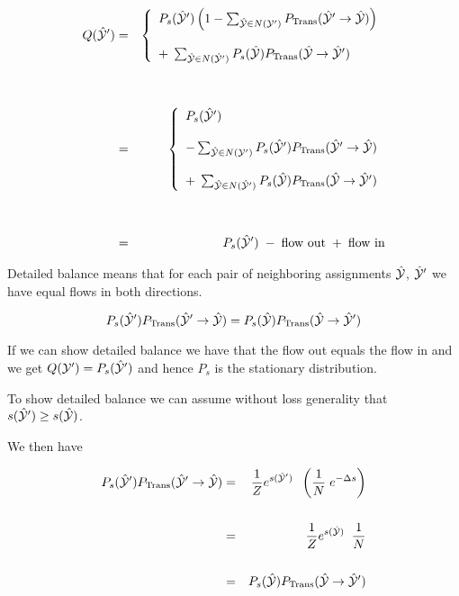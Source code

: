 {{\huge
\begin{eqnarray*}
Q(\hat{\cal Y}')& = &  \left\{\begin{array}{l}P_s(\hat{\cal Y}')\left(1-\sum_{\hat{\cal Y} \in N({\cal Y'})} P_\mathrm{Trans}(\hat{\cal Y}'\rightarrow \hat{\cal Y})\right) \\
\\
  + \; \sum_{\hat{\cal Y} \in N(\hat{\cal Y}')} P_s(\hat{\cal Y}){P_{\mathrm{Trans}}(\hat{\cal Y} \rightarrow \hat{\cal Y}')}\end{array}\right. \\
  \\
  \\
  & = &  \left\{\begin{array}{l}P_s(\hat{\cal Y}') \\
  \\
  -\sum_{\hat{\cal Y} \in N({\cal Y'})} P_s(\hat{\cal Y}')P_\mathrm{Trans}(\hat{\cal Y}'\rightarrow \hat{\cal Y}) \\
\\
  + \; \sum_{\hat{\cal Y} \in N(\hat{\cal Y}')} P_s(\hat{\cal Y}){P_{\mathrm{Trans}}(\hat{\cal Y} \rightarrow \hat{\cal Y}')}\end{array}\right. \\
  \\
  \\
  &= & P_s(\hat{\cal Y}')\; - \;\mbox{flow out}\; +\;\mbox{flow in}
\end{eqnarray*}
}


Detailed balance means that for each pair of neighboring assignments $\hat{\cal Y}$, $\hat{\cal Y}'$ we have equal flows in both directions.

\vfill
$$P_s(\hat{\cal Y}')P_{\mathrm{Trans}}(\hat{\cal Y}' \rightarrow \hat{\cal Y}) = P_s(\hat{\cal Y})P_{\mathrm{Trans}}(\hat{\cal Y} \rightarrow \hat{\cal Y}')$$

\vfill
If we can show detailed balance we have that the flow out equals the flow in and we get $Q({\cal Y'}) = P_s(\hat{\cal Y}')$ and hence $P_s$ is the stationary distribution.


To show detailed balance we can assume without loss generality that $s(\hat{\cal Y}') \geq s(\hat{\cal Y})$.

\vfill
We then have

\begin{eqnarray*}
P_s(\hat{\cal Y}')P_{\mathrm{Trans}}(\hat{\cal Y}' \rightarrow \hat{\cal Y}) & = & \frac{1}{Z}e^{s(\hat{\cal Y}')}\;\;\left(\frac{1}{N}\;e^{-\Delta s}\right) \\
\\
& = & \frac{1}{Z}e^{s(\hat{\cal Y})}\;\;\frac{1}{N} \\
\\
 &= &P_s(\hat{\cal Y})P_{\mathrm{Trans}}(\hat{\cal Y} \rightarrow \hat{\cal Y}')
\end{eqnarray*}

}
